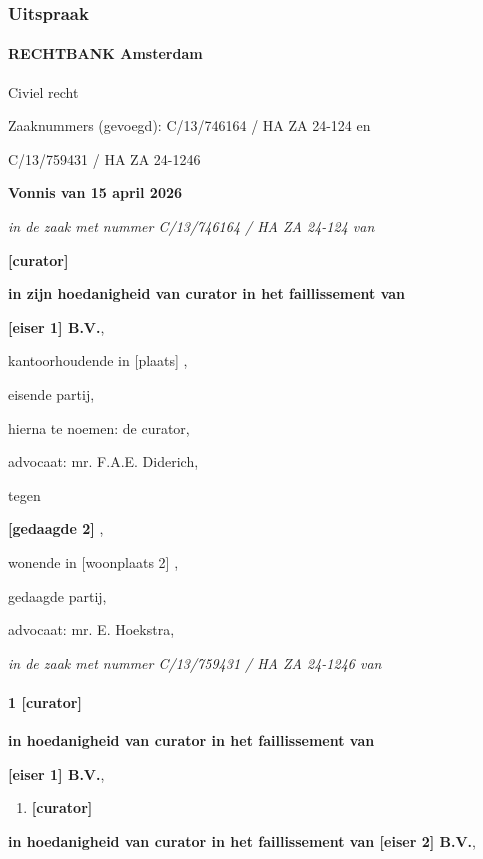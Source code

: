 \documentclass[
  dutch,
  a4paper,
]{article}
\providecommand{\tightlist}{%
  \setlength{\itemsep}{0pt}\setlength{\parskip}{0pt}}
\begin{document}
\subsubsection{Uitspraak}\label{uitspraak-2}

\paragraph{RECHTBANK Amsterdam}\label{rechtbank-amsterdam}

Civiel recht

Zaaknummers (gevoegd): C/13/746164 / HA ZA 24-124 en

C/13/759431 / HA ZA 24-1246

\textbf{Vonnis van 15 april 2026}

\emph{in de zaak met nummer C/13/746164 / HA ZA 24-124 van}

\textbf{{[}curator{]}}

\textbf{in zijn hoedanigheid van curator in het faillissement van}

\textbf{{[}eiser 1{]} B.V.},

kantoorhoudende in {[}plaats{]} ,

eisende partij,

hierna te noemen: de curator,

advocaat: mr. F.A.E. Diderich,

tegen

\textbf{{[}gedaagde 2{]}}
,

wonende in {[}woonplaats 2{]} ,

gedaagde partij,

advocaat: mr. E. Hoekstra,

\emph{in de zaak met nummer C/13/759431 / HA ZA 24-1246 van}

\paragraph{1 {[}curator{]}}\label{curator}

\textbf{in hoedanigheid van curator in het faillissement van}

\textbf{{[}eiser 1{]} B.V.},

\begin{enumerate}
\def\labelenumi{\arabic{enumi}.}
\setcounter{enumi}{1}
\tightlist
\item
  \textbf{{[}curator{]}}
\end{enumerate}

\textbf{in hoedanigheid van curator in het faillissement van {[}eiser 2{]} B.V.},
\end{document}
